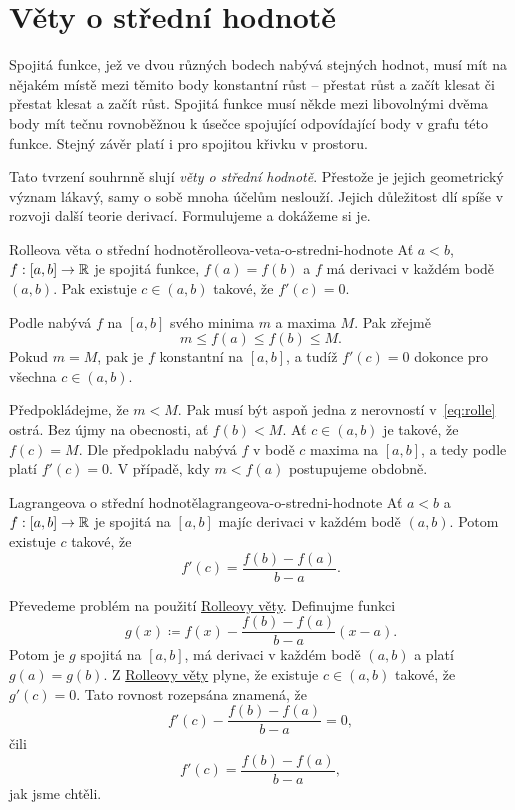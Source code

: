 \section{Věty o střední hodnotě}
\label{sec:vety-o-stredni-hodnote}

Spojitá funkce, jež ve dvou různých bodech nabývá stejných hodnot, musí mít na
nějakém místě mezi těmito body konstantní růst -- přestat růst a začít klesat či
přestat klesat a začít růst. Spojitá funkce musí někde mezi libovolnými dvěma
body mít tečnu rovnoběžnou k úsečce spojující odpovídající body v grafu této
funkce. Stejný závěr platí i pro spojitou křivku v prostoru.

Tato tvrzení souhrnně slují \emph{věty o střední hodnotě}. Přestože je jejich
geometrický význam lákavý, samy o sobě mnoha účelům neslouží. Jejich důležitost
dlí spíše v rozvoji další teorie derivací. Formulujeme a dokážeme si je.

\begin{theorem}{Rolleova věta o střední hodnotě}{rolleova-veta-o-stredni-hodnote}
 Ať $a < b$, $f:[a,b] \to \mathbb{R}$ je spojitá funkce, $f(a) = f(b)$ a $f$ má derivaci
 v každém bodě $(a,b)$. Pak existuje $c \in (a,b)$ takové, že $f'(c) = 0$.
\end{theorem}
\begin{thmproof}
 Podle  nabývá $f$ na $[a,b]$ svého
 minima $m$ a maxima $M$. Pak zřejmě
 \begin{equation*}
  \label{eq:rolle}
  \tag{$*$}
  m \leq f(a) \leq f(b) \leq M.
 \end{equation*}
 Pokud $m = M$, pak je $f$ konstantní na $[a,b]$, a tudíž $f'(c) = 0$ dokonce
 pro všechna $c \in (a,b)$.

 Předpokládejme, že $m < M$. Pak musí být aspoň jedna z nerovností
 v~\eqref{eq:rolle} ostrá. Bez újmy na obecnosti, ať $f(b) < M$. Ať $c \in
 (a,b)$ je takové, že $f(c) = M$. Dle předpokladu nabývá $f$ v bodě $c$ maxima
 na $[a,b]$, a tedy podle  platí
 $f'(c) = 0$. V případě, kdy $m < f(a)$ postupujeme obdobně.
\end{thmproof}

\begin{theorem}{Lagrangeova o střední hodnotě}{lagrangeova-o-stredni-hodnote}
 Ať $a < b$ a $f:[a,b] \to \mathbb{R}$ je spojitá na $[a,b]$ majíc derivaci v každém
 bodě $(a,b)$. Potom existuje $c$ takové, že
 \[
  f'(c) = \frac{f(b) - f(a)}{b - a}.
 \]
\end{theorem}
\begin{thmproof}
 Převedeme problém na použití
 \hyperref[thm:rolleova-veta-o-stredni-hodnote]{Rolleovy věty}. Definujme funkci
 \[
  g(x) \coloneqq f(x) - \frac{f(b) - f(a)}{b-a} (x-a).
 \]
 Potom je $g$ spojitá na $[a,b]$, má derivaci v každém bodě $(a,b)$ a platí
 $g(a) = g(b)$. Z \hyperref[thm:rolleova-veta-o-stredni-hodnote]{Rolleovy
 věty} plyne, že existuje $c \in (a,b)$ takové, že $g'(c) = 0$. Tato rovnost
 rozepsána znamená, že
 \[
  f'(c) - \frac{f(b) - f(a)}{b - a} = 0,
 \]
 čili
 \[
  f'(c) = \frac{f(b) - f(a)}{b-a},
 \]
 jak jsme chtěli.
\end{thmproof}

